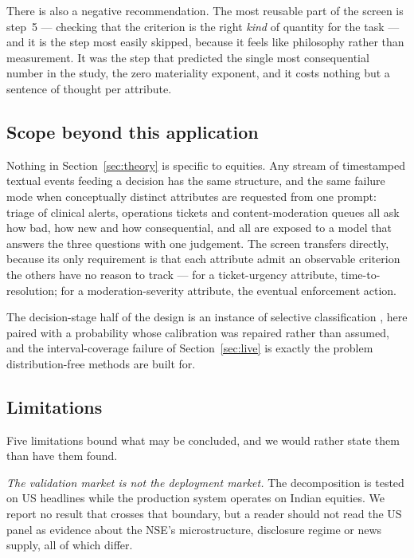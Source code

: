 \documentclass[preprint,12pt,authoryear]{elsarticle}
\theoremstyle{plain}
\theoremstyle{remark}
\begin{document}
There is also a negative recommendation. The most reusable part of the screen is
step~5 --- checking that the criterion is the right \emph{kind} of quantity for
the task --- and it is the step most easily skipped, because it feels like
philosophy rather than measurement. It was the step that predicted the single
most consequential number in the study, the zero materiality exponent, and it
costs nothing but a sentence of thought per attribute.

\subsection{Scope beyond this application}

Nothing in Section~\ref{sec:theory} is specific to equities. Any stream of
timestamped textual events feeding a decision has the same structure, and the
same failure mode when conceptually distinct attributes are requested from one
prompt: triage of clinical alerts, operations tickets and content-moderation
queues all ask how bad, how new and how consequential, and all are exposed to a
model that answers the three questions with one judgement. The screen transfers
directly, because its only requirement is that each attribute admit an observable
criterion the others have no reason to track --- for a ticket-urgency attribute,
time-to-resolution; for a moderation-severity attribute, the eventual enforcement
action.

The decision-stage half of the design is an instance of selective classification
\citep{chow1970,geifman2017}, here paired with a probability whose calibration was
repaired rather than assumed, and the interval-coverage failure of
Section~\ref{sec:live} is exactly the problem distribution-free methods
\citep{angelopoulos2023} are built for.

\subsection{Limitations}\label{sec:limits}

Five limitations bound what may be concluded, and we would rather state them than
have them found.

\emph{The validation market is not the deployment market.} The decomposition is
tested on US headlines while the production system operates on Indian equities.
We report no result that crosses that boundary, but a reader should not read the
US panel as evidence about the NSE's microstructure, disclosure regime or news
supply, all of which differ.
\end{document}
